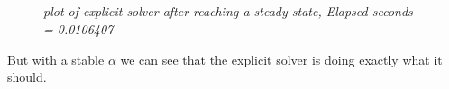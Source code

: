 \documentclass[english,a4paper,12pt]{article}
\begin{document}
\subsection*{}
\begin{figure}[H]
 \begin{center}
 \end{center}
 \caption{\textit{plot of explicit solver after reaching a steady state,  Elapsed seconds = 0.0106407}}
 \label{fig:edge}
\end{figure}

But with a stable $\alpha$ we can see that the explicit solver is doing exactly what it should.
\end{document}
